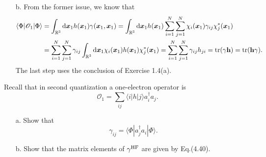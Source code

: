 \documentclass[a4paper]{book}
\newcounter{exercise}[chapter]
\newcounter{solution}[chapter]
\newcommand\tr[1]{\mathrm{tr(#1)}}
\newcommand*{\dif}{\mathop{}\!\mathrm{d}}
\newcommand{\HF}{{\rm HF}}
\newcommand{\h}{{\bf h}}
\begin{document}
\begin{solution}
\begin{itemize}
	\item[b.] From the former issue, we know that 	
	\begin{align*}
		\langle \Phi | \mathscr{O}_1 | \Phi \rangle &= \int_{ \mathbb{R}^3 } \dif \boldsymbol{x}_1 h( \boldsymbol{x}_1 ) \gamma( \boldsymbol{x}_1 , \boldsymbol{x}_1 ) = \int_{ \mathbb{R}^3 } \dif \boldsymbol{x}_1 h( \boldsymbol{x}_1 ) \sum_{ i=1 }^N \sum_{ j=1 }^N \chi_i( \boldsymbol{x}_1 ) \gamma_{ij} \chi^*_j( \boldsymbol{x}_1 ) \\
		&= \sum_{ i=1 }^N \sum_{ j=1 }^N \gamma_{ij} \int_{ \mathbb{R}^3 } \dif \boldsymbol{x}_1 \chi_i( \boldsymbol{x}_1 ) h( \boldsymbol{x}_1 ) \chi^*_j( \boldsymbol{x}_1 ) = \sum_{ i=1 }^N \sum_{ j=1 }^N \gamma_{ij} h_{ji} = \tr{\gamma \h} = \tr{\h \gamma}.
	\end{align*}
	The last step uses the conclusion of Exercise 1.4(a).
	\end{itemize}		
	
	\end{solution}
	
	\begin{exercise}
	Recall that in second quantization a one-electron operator is
	\[
		\mathscr{O}_1 = \sum_{ij} \langle i | h | j \rangle a^\dagger_i a_j.
	\]
	\begin{enumerate}
	
	\item[a.] Show that
	\[
		\gamma_{ij} = \langle \Phi | a^\dagger_j a_i | \Phi \rangle.
	\]
	
	\item[b.] Show that the matrix elements of $\gamma^{\HF}$ are given by Eq.(4.40).
	
	\end{enumerate}
	\end{exercise}
	
\end{document}
